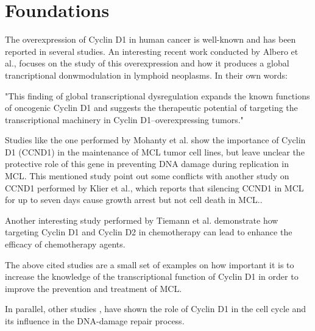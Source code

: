 \onehalfspacing

\section{Foundations}

The overexpression of Cyclin D1 in human cancer is well-known\cite{Lamb2003} and has been reported in several studies\cite{2017Reena}.
An interesting recent work conducted by Albero et al.\cite{10.1172/JCI96520}, focuses on the study of this overexpression and how it produces a global trancriptional donwmodulation in lymphoid neoplasms. In their own words:

"This finding of global transcriptional dysregulation expands the known functions of oncogenic Cyclin D1 and suggests the therapeutic potential of targeting the transcriptional machinery in Cyclin D1–overexpressing tumors."
\cite{10.1172/JCI96520}

Studies like the one performed by Mohanty et al.\cite{Mohanty2017} show the importance of Cyclin D1 (CCND1) in the maintenance of MCL tumor cell lines, but leave unclear the protective role of this gene in preventing DNA damage during replication in MCL. This mentioned study point out some conflicts with another study on CCND1 performed by Klier et al.\cite{Klier2008}, which reports that silencing CCND1 in MCL for up to seven days cause growth arrest but not cell death in MCL.\cite{Mohanty2017}.

Another interesting study performed by Tiemann et al.\cite{Tiemann2011} demonstrate how targeting Cyclin D1 and Cyclin D2 in chemotherapy can lead to enhance the efficacy of chemotherapy agents.

The above cited studies are a small set of examples on how important it is to increase the knowledge of the transcriptional function of Cyclin D1 in order to improve the prevention and treatment of MCL.

In parallel, other studies \cite{DiSante2017} \cite{Casimiro2016}, have shown the role of Cyclin D1 in the cell cycle and its influence in the DNA-damage repair process.

